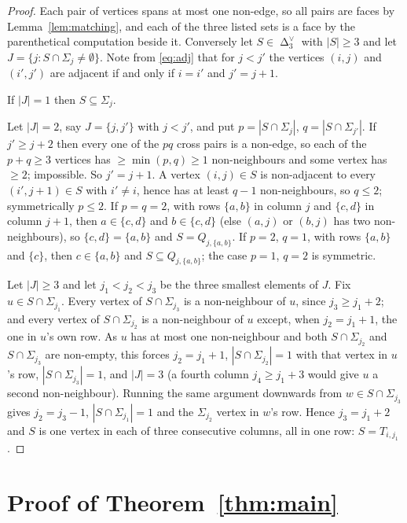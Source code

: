 \documentclass[11pt]{amsart}
\DeclareMathOperator{\Cut}{\Delta}
\newcommand{\Dual}[1]{#1^{\vee}}
\begin{document}
\begin{proof}
Each pair of vertices spans at most one non-edge, so all pairs are faces by
Lemma~\ref{lem:matching}, and each of the three listed sets is a face by the parenthetical
computation beside it. Conversely let $S \in \Dual{\Cut_3}$ with $|S| \ge 3$ and let
$J = \{j : S \cap \Sigma_j \ne \emptyset\}$. Note from \eqref{eq:adj} that for $j<j'$ the
vertices $(i,j)$ and $(i',j')$ are adjacent if and only if $i=i'$ and $j'=j+1$.

If $|J|=1$ then $S \subseteq \Sigma_j$.

Let $|J| = 2$, say $J=\{j,j'\}$ with $j<j'$, and put $p = |S\cap\Sigma_j|$,
$q=|S\cap\Sigma_{j'}|$. If $j' \ge j+2$ then every one of the $pq$ cross pairs is a non-edge, so
each of the $p+q \ge 3$ vertices has $\ge \min(p,q) \ge 1$ non-neighbours and some vertex has
$\ge2$; impossible. So $j'=j+1$. A vertex $(i,j)\in S$ is non-adjacent to every $(i',j+1)\in S$
with $i'\ne i$, hence has at least $q-1$ non-neighbours, so $q \le 2$; symmetrically $p\le2$. If
$p=q=2$, with rows $\{a,b\}$ in column $j$ and $\{c,d\}$ in column $j+1$, then $a \in \{c,d\}$
and $b\in\{c,d\}$ (else $(a,j)$ or $(b,j)$ has two non-neighbours), so $\{c,d\}=\{a,b\}$ and
$S = Q_{j,\{a,b\}}$. If $p=2$, $q=1$, with rows $\{a,b\}$ and $\{c\}$, then $c \in \{a,b\}$ and
$S \subseteq Q_{j,\{a,b\}}$; the case $p=1$, $q=2$ is symmetric.

Let $|J|\ge3$ and let $j_1<j_2<j_3$ be the three smallest elements of $J$. Fix
$u \in S\cap\Sigma_{j_1}$. Every vertex of $S \cap \Sigma_{j_3}$ is a non-neighbour of $u$, since
$j_3 \ge j_1+2$; and every vertex of $S\cap\Sigma_{j_2}$ is a non-neighbour of $u$ except, when
$j_2 = j_1+1$, the one in $u$'s own row. As $u$ has at most one non-neighbour and both
$S\cap\Sigma_{j_2}$ and $S\cap\Sigma_{j_3}$ are non-empty, this forces $j_2 = j_1+1$,
$|S\cap\Sigma_{j_2}|=1$ with that vertex in $u$'s row, $|S\cap\Sigma_{j_3}|=1$, and $|J|=3$
(a fourth column $j_4 \ge j_1+3$ would give $u$ a second non-neighbour). Running the same argument
downwards from $w \in S \cap \Sigma_{j_3}$ gives $j_2 = j_3-1$, $|S\cap\Sigma_{j_1}|=1$ and the
$\Sigma_{j_2}$ vertex in $w$'s row. Hence $j_3=j_1+2$ and $S$ is one vertex in each of three
consecutive columns, all in one row: $S = T_{i,j_1}$.
\end{proof}

\section{Proof of Theorem~\ref{thm:main}}
\end{document}
